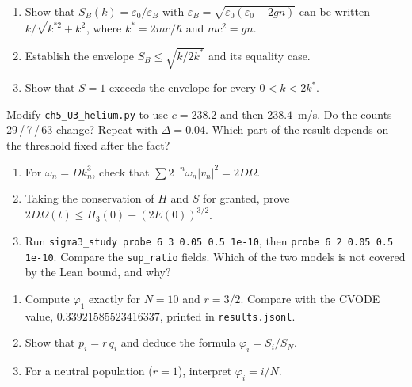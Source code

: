 \begin{exercise}[U3, proof]\label{ch5:ex:U3a}
\begin{enumerate}
\item Show that $S_B(k)=\varepsilon_0/\varepsilon_B$ with $\varepsilon_B=\sqrt{\varepsilon_0(\varepsilon_0+2gn)}$
can be written $k/\sqrt{k^{*2}+k^2}$, where $k^*=2mc/\hbar$ and $mc^2=gn$.
\item Establish the envelope $S_B\le\sqrt{k/2k^*}$ and its equality case.
\item Show that $S=1$ exceeds the envelope for every $0<k<2k^*$.
\end{enumerate}
\end{exercise}

\begin{exercise}[U3, (S)]\label{ch5:ex:U3b}
Modify \texttt{ch5\_U3\_helium.py} to use $c=238.2$ and then $238.4$~m/s. Do the counts
29\,/\,7\,/\,63 change? Repeat with $\Delta=0.04$. Which part of the result depends on the threshold fixed after
the fact?
\end{exercise}

\begin{exercise}\label{ch5:ex:U4}
\begin{enumerate}
\item For $\omega_n=Dk_n^3$, check that $\sum2^{-n}\omega_n|v_n|^2=2D\Omega$.
\item Taking the conservation of $H$ and $S$ for granted, prove $2D\Omega(t)\le H_3(0)+(2E(0))^{3/2}$.
\item Run \texttt{sigma3\_study probe 6 3 0.05 0.5 1e-10}, then \texttt{probe 6 2 0.05 0.5 1e-10}. Compare the
\texttt{sup\_ratio} fields. Which of the two models is not covered by the Lean bound, and why?
\end{enumerate}
\end{exercise}

\begin{exercise}[U5, computation]\label{ch5:ex:U5a}
\begin{enumerate}
\item Compute $\varphi_1$ exactly for $N=10$ and $r=3/2$. Compare with the CVODE value,
$0.33921585523416337$, printed in \texttt{results.jsonl}.
\item Show that $p_i=r\,q_i$ and deduce the formula $\varphi_i=S_i/S_N$.
\item For a neutral population ($r=1$), interpret $\varphi_i=i/N$.
\end{enumerate}
\end{exercise}

